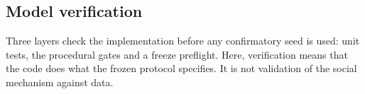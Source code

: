 \subsection{Model verification}\label{sec:verification}

Three layers check the implementation before any confirmatory seed is used: unit tests, the procedural gates and a freeze preflight. Here, verification means that the code does what the frozen protocol specifies. It is not validation of the social mechanism against data.

